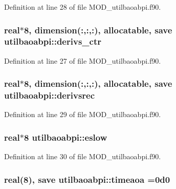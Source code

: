Definition at line 28 of file M\-O\-D\-\_\-utilbaoabpi.\-f90.

\hypertarget{classutilbaoabpi_aa4c57851112377f82b13361a27277120}{
\subsubsection[{derivs\-\_\-ctr}]{\setlength{\rightskip}{0pt plus 5cm}real$\ast$8, dimension(\-:,\-:,\-:), allocatable, save utilbaoabpi\-::derivs\-\_\-ctr}}\label{classutilbaoabpi_aa4c57851112377f82b13361a27277120}


Definition at line 27 of file M\-O\-D\-\_\-utilbaoabpi.\-f90.

\hypertarget{classutilbaoabpi_a33c76ac8241feb8e9c8669731a605d65}{
\subsubsection[{derivsrec}]{\setlength{\rightskip}{0pt plus 5cm}real$\ast$8, dimension(\-:,\-:,\-:), allocatable, save utilbaoabpi\-::derivsrec}}\label{classutilbaoabpi_a33c76ac8241feb8e9c8669731a605d65}


Definition at line 29 of file M\-O\-D\-\_\-utilbaoabpi.\-f90.

\hypertarget{classutilbaoabpi_a9caab6874b7ea252f61f3a9ff137854a}{
\subsubsection[{eslow}]{\setlength{\rightskip}{0pt plus 5cm}real$\ast$8 utilbaoabpi\-::eslow}}\label{classutilbaoabpi_a9caab6874b7ea252f61f3a9ff137854a}


Definition at line 30 of file M\-O\-D\-\_\-utilbaoabpi.\-f90.

\hypertarget{classutilbaoabpi_a2852b9f4bf70cdfb023ae00de30fb391}{
\subsubsection[{timeaoa}]{\setlength{\rightskip}{0pt plus 5cm}real(8), save utilbaoabpi\-::timeaoa =0d0}}\label{classutilbaoabpi_a2852b9f4bf70cdfb023ae00de30fb391}


